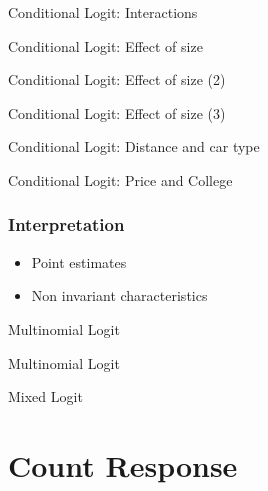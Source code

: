 \documentclass{beamer}
\newcommand{\1}{\mathbb{1}}
\begin{document}
\begin{frame}{Conditional Logit: Interactions}

\end{frame}

\begin{frame}{Conditional Logit: Effect of size}

\end{frame}

\begin{frame}{Conditional Logit: Effect of size (2)}

\end{frame}

\begin{frame}{Conditional Logit: Effect of size (3)}

\end{frame}

\begin{frame}{Conditional Logit: Distance and car type}

\end{frame}

\begin{frame}{Conditional Logit: Price and College}

\end{frame}


\begin{frame}\frametitle{Interpretation}
\begin{itemize}
 \item Point estimates
 \item Non invariant characteristics
\end{itemize}
\end{frame}

\begin{frame}{Multinomial Logit}

\end{frame}

\begin{frame}{Multinomial Logit}

\end{frame}

\begin{frame}{Mixed Logit}

\end{frame}


\section{Count Response}
\end{document}
